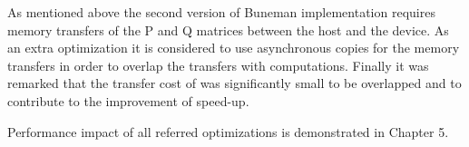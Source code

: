 As mentioned above the second version of Buneman implementation requires memory transfers of the P and Q matrices between the host and the device. As an extra optimization it is considered to use asynchronous copies for the memory transfers in order to overlap the transfers with computations. Finally it was remarked that the transfer cost of  was significantly small to be overlapped and to contribute to the improvement of speed-up.    

Performance impact of all referred optimizations is demonstrated in Chapter 5. 